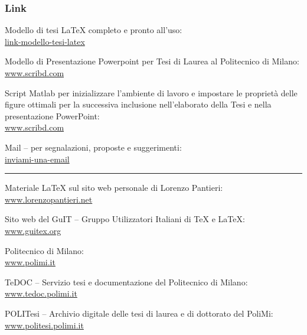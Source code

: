 \subsubsection{Link}
%
\noindent Modello di tesi \LaTeX{} completo e pronto all'uso: \\
\href{http://bit.ly/1id0dtK}{link-modello-tesi-latex}

\medskip
%
\noindent Modello di Presentazione Powerpoint per Tesi di Laurea al Politecnico di Milano: \\
\href{http://www.scribd.com/doc/221624236/Modello-PPT-per-Tesi}{www.scribd.com}

\medskip
%
\noindent Script Matlab per inizializzare l'ambiente di lavoro e impostare le proprietà delle figure ottimali per la successiva inclusione nell'elaborato della Tesi e nella presentazione PowerPoint: \\
\href{http://www.scribd.com/doc/221576068/Script-Matlab-per-Tesi}{www.scribd.com}

\medskip
%
\noindent Mail -- per segnalazioni, proposte e suggerimenti: \\
\href{mailto:luca.maggiori@mail.polimi.it}{inviami-una-email}

\noindent \rule{0.4\textwidth}{.4pt}

\medskip
%
\noindent Materiale \LaTeX{} sul sito web personale di Lorenzo Pantieri: \\
\href{http://www.lorenzopantieri.net/LaTeX.html}{www.lorenzopantieri.net}

\medskip
%
\noindent Sito web del GuIT -- Gruppo Utilizzatori Italiani di \TeX{} e \LaTeX{}: \\
\href{http://www.guitex.org/home/}{www.guitex.org}

\medskip
%
\noindent Politecnico di Milano: \\
\href{http://www.polimi.it/}{www.polimi.it}

\medskip
%
\noindent TeDOC -- Servizio tesi e documentazione del Politecnico di Milano: \\
\href{http://www.tedoc.polimi.it/}{www.tedoc.polimi.it}

\medskip
%
\noindent POLITesi -- Archivio digitale delle tesi di laurea e di dottorato del PoliMi: \\
\href{https://www.politesi.polimi.it/}{www.politesi.polimi.it}
%
